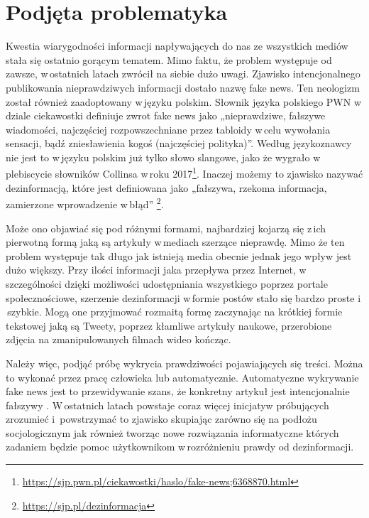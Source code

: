 
\newpage %
\section{Podjęta problematyka}
Kwestia wiarygodności informacji napływających do nas ze wszystkich mediów stała się ostatnio gorącym tematem. Mimo faktu, że problem występuje od zawsze, w\,ostatnich latach zwrócił na siebie dużo uwagi. Zjawisko intencjonalnego publikowania nieprawdziwych informacji dostało nazwę fake news. 
Ten neologizm został również zaadoptowany w\,języku polskim. Słownik języka polskiego PWN w\,dziale ciekawostki definiuje zwrot fake news jako „nieprawdziwe, fałszywe wiadomości, najczęściej rozpowszechniane przez tabloidy w\,celu wywołania sensacji, bądź zniesławienia kogoś (najczęściej polityka)”. Według językoznawcy nie jest to w\,języku polskim już tylko słowo slangowe, jako że wygrało w\,plebiscycie słowników Collinsa w\,roku 2017\footnote{\url{https://sjp.pwn.pl/ciekawostki/haslo/fake-news;6368870.html}}.  Inaczej możemy to zjawisko nazywać dezinformacją, które jest definiowana jako „fałszywa, rzekoma informacja, zamierzone wprowadzenie w\,błąd” \footnote{\url{https://sjp.pl/dezinformacja}}. 
\par Może ono objawiać się pod różnymi formami, najbardziej kojarzą się z\,ich pierwotną formą jaką są artykuły w\,mediach szerzące nieprawdę. Mimo że ten problem występuje tak długo jak istnieją media obecnie jednak jego wpływ jest dużo większy. Przy ilości informacji jaka przepływa przez Internet, w\,szczególności dzięki możliwości udostępniania wszystkiego poprzez portale społecznościowe, szerzenie dezinformacji w\,formie postów stało się bardzo proste i \,szybkie. Mogą one przyjmować rozmaitą formę zaczynając na krótkiej formie tekstowej jaką są Tweety, poprzez kłamliwe artykuły naukowe, przerobione zdjęcia na zmanipulowanych filmach wideo kończąc. 
\par Należy więc, podjąć próbę wykrycia prawdziwości pojawiających się treści. Można to wykonać przez pracę człowieka lub automatycznie. Automatyczne wykrywanie fake news jest to przewidywanie szans, że konkretny artykuł jest intencjonalnie fałszywy \cite{threeTypeOfFakes2015}. W\,ostatnich latach powstaje coraz więcej inicjatyw próbujących zrozumieć i \,powstrzymać to zjawisko skupiając zarówno się na podłożu socjologicznym jak również tworząc nowe rozwiązania informatyczne których zadaniem będzie pomoc użytkownikom w\,rozróżnieniu prawdy od dezinformacji.

